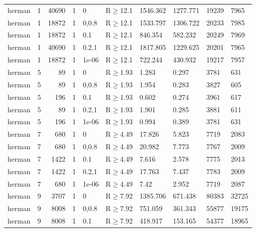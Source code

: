 \begin{longtable}{llrrllllll}
 herman        & 1        &  	40690 & 1 & 0     & R$\geq$12.1  & 1546.362 & 1277.771 & 19239   & 7965   \\
 herman        & 1        &  	18872 & 1 & 0,0.8 & R$\geq$12.1  & 1533.797 & 1306.722 & 20233   & 7985   \\
 herman        & 1        &  	18872 & 1 & 0.1   & R$\geq$12.1  & 846.354  & 582.232  & 20249   & 7969   \\
 herman        & 1        &  	40690 & 1 & 0.2,1 & R$\geq$12.1  & 1817.805 & 1229.625 & 20201   & 7965   \\
 herman        & 1        &  	18872 & 1 & 1e-06 & R$\geq$12.1  & 722.244  & 430.932  & 19217   & 7957   \\
 herman        & 5        &     	89 & 1 & 0     & R$\geq$1.93  & 1.283    & 0.297    & 3781    & 631    \\
 herman        & 5        &     	89 & 1 & 0,0.8 & R$\geq$1.93  & 1.954    & 0.283    & 3827    & 605    \\
 herman        & 5        &    	196 & 1 & 0.1   & R$\geq$1.93  & 0.602    & 0.274    & 3961    & 617    \\
 herman        & 5        &     	89 & 1 & 0.2,1 & R$\geq$1.93  & 1.901    & 0.285    & 3881    & 611    \\
 herman        & 5        &    	196 & 1 & 1e-06 & R$\geq$1.93  & 0.994    & 0.389    & 3781    & 631    \\
 herman        & 7        &    	680 & 1 & 0     & R$\geq$4.49  & 17.826   & 5.823    & 7719    & 2083   \\
 herman        & 7        &    	680 & 1 & 0,0.8 & R$\geq$4.49  & 20.982   & 7.773    & 7767    & 2009   \\
 herman        & 7        &   	1422 & 1 & 0.1   & R$\geq$4.49  & 7.616    & 2.578    & 7775    & 2013   \\
 herman        & 7        &   	1422 & 1 & 0.2,1 & R$\geq$4.49  & 17.763   & 7.437    & 7783    & 2009   \\
 herman        & 7        &    	680 & 1 & 1e-06 & R$\geq$4.49  & 7.42     & 2.952    & 7719    & 2087   \\
 herman        & 9        &   	3707 & 1 & 0     & R$\geq$7.92  & 1385.706 & 671.438  & 80383   & 32725  \\
 herman        & 9        &   	8008 & 1 & 0,0.8 & R$\geq$7.92  & 751.059  & 361.343  & 55877   & 19175  \\
 herman        & 9        &   	8008 & 1 & 0.1   & R$\geq$7.92  & 418.917  & 153.165  & 54377   & 18965  \\

\end{longtable}
